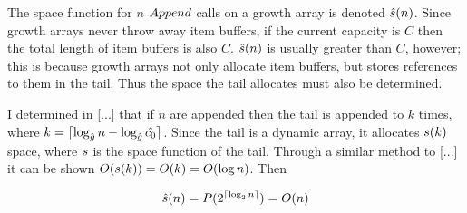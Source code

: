The space function for $n$ $Append$ calls on a growth array is denoted $\hat{s}(n)$. Since growth arrays never throw away item buffers, if the current capacity is $C$ then the total length of item buffers is also $C$. $\hat{s}(n)$ is usually greater than $C$, however; this is because growth arrays not only allocate item buffers, but stores references to them in the tail. Thus the space the tail allocates must also be determined.

I determined in [...] that if $n$ are appended then the tail is appended to $k$ times, where $k = \lceil \log_{\hat{g}} n - \log_{\hat{g}} \hat{c_0} \rceil$. Since the tail is a dynamic array, it allocates $s(k)$ space, where $s$ is the space function of the tail. Through a similar method to [...] it can be shown $O(s(k)) = O(k) = O(\log n)$. Then %

\begin{align*}
\hat{s}(n) = P(2^{\lceil \log_2 n \rceil}) = O(n)
\end{align*}